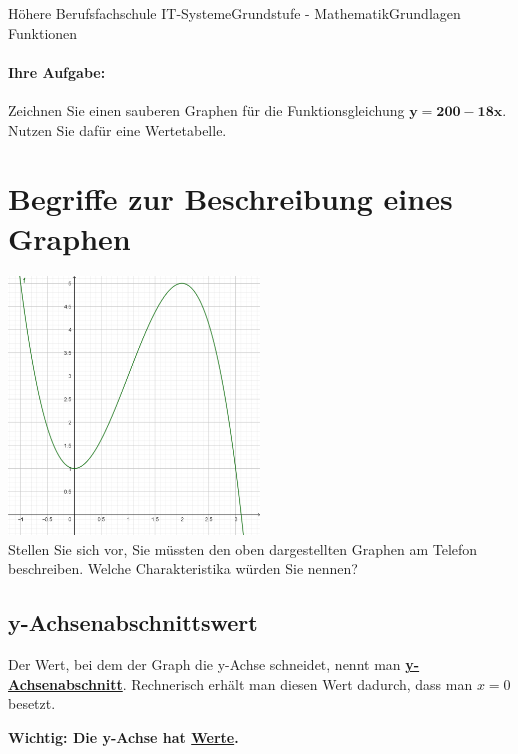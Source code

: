 \documentclass[11pt,twocolumn,oneside,openany,headings=optiontotoc,11pt,numbers=noenddot]{article}
\begin{document}
\begin{worksheet}{Höhere Berufsfachschule IT-Systeme}{Grundstufe - Mathematik}{Grundlagen Funktionen}
		\paragraph{Ihre Aufgabe:} Zeichnen Sie einen sauberen Graphen für die Funktionsgleichung \(\mathbf{y = 200-18x}\).\\
		Nutzen Sie dafür eine Wertetabelle.
		\newpage
		\section{Begriffe zur Beschreibung eines Graphen}
		\includegraphics[width=0.5\textwidth]{../99_Bilder/basicsBsp.png}\\
		Stellen Sie sich vor, Sie müssten den oben dargestellten Graphen am Telefon beschreiben. Welche Charakteristika würden Sie nennen?
		\subsection*{y-Achsenabschnittswert}
		Der Wert, bei dem der Graph die y-Achse schneidet, nennt man \textbf{\underline{y-Achsenabschnitt}}. Rechnerisch erhält man diesen Wert dadurch, dass man \(x= 0\) besetzt.\\
		\par\bigskip\noindent
		\textbf{Wichtig: Die y-Achse hat \underline{Werte}.}

\end{worksheet}
\end{document}
